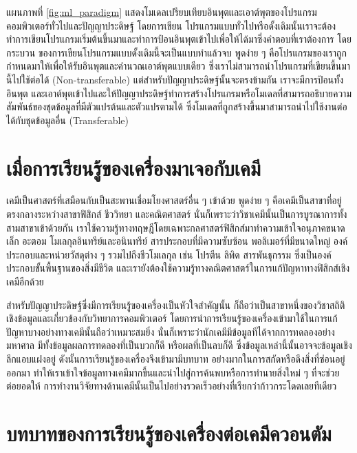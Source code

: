 แผนภาพที่ \ref{fig:ml_paradigm} แสดงโมเดลเปรียบเทียบอินพุตและเอาต์พุตของโปรแกรมคอมพิวเตอร์ทั่วไปและปัญญาประดิษฐ์ โดยการเขียน%
โปรแกรมแบบทั่วไปหรือดั้งเดิมนั้นเราจะต้องทำการเขียนโปรแกรมเริ่มต้นขึ้นมาและทำการป้อนอินพุตเข้าไปเพื่อให้ได้มาซึ่งคำตอบที่เราต้องการ โดยกระบวน%
ของการเขียนโปรแกรมแบบดั้งเดิมนี้จะเป็นแบบทำแล้วจบ พูดง่าย ๆ คือโปรแกรมของเราถูกกำหนดมาให้เพื่อให้รับอินพุตและคำนวณเอาต์พุตแบบเดียว
ซึ่งเราไม่สามารถนำโปรแกรมที่เขียนขึ้นมานี้ไปใช้ต่อได้ (Non-transferable) แต่สำหรับปัญญาประดิษฐ์นั้นจะตรงข้ามกัน เราจะมีการป้อนทั้งอินพุต%
และเอาต์พุตเข้าไปและให้ปัญญาประดิษฐ์ทำการสร้างโปรแกรมหรือโมเดลที่สามารถอธิบายความสัมพันธ์ของชุดข้อมูลที่มีตัวแปรต้นและตัวแปรตามได้ 
ซึ่งโมเดลที่ถูกสร้างขึ้นมาสามารถนำไปใช้งานต่อได้กับชุดข้อมูลอื่น (Transferable)

\section{เมื่อการเรียนรู้ของเครื่องมาเจอกับเคมี}

เคมีเป็นศาสตร์ที่เสมือนกับเป็นสะพานเชื่อมโยงศาสตร์อื่น ๆ เข้าด้วย พูดง่าย ๆ คือเคมีเป็นสาขาที่อยู่ตรงกลางระหว่างสาขาฟิสิกส์ ชีววิทยา และคณิตศาสตร์
นั่นก็เพราะว่าวิชาเคมีนั้นเป็นการบูรณาการทั้งสามสาขาเข้าด้วยกัน เราใช้ความรู้ทางทฤษฎีโดยเฉพาะกลศาสตร์ฟิสิกส์มาทำความเข้าใจอนุภาคขนาดเล็ก 
อะตอม โมเลกุลอินทรีย์และอนินทรีย์ สารประกอบที่มีความซับซ้อน พอลิเมอร์ที่มีขนาดใหญ่ องค์ประกอบและหน่วยวัสดุต่าง ๆ รวมไปถึงชีวโมเลกุล เช่น 
โปรตีน ลิพิด สารพันธุกรรม ซึ่งเป็นองค์ประกอบขั้นพื้นฐานของสิ่งมีชีวิต และเรายังต้องใช้ความรู้ทางคณิตศาสตร์ในการแก้ปัญหาทางฟิสิกส์เชิงเคมีอีกด้วย

สำหรับปัญญาประดิษฐ์ซึ่งมีการเรียนรู้ของเครื่องเป็นหัวใจสำคัญนั้น ก็ถือว่าเป็นสาขาหนึ่งของวิชาสถิติเชิงข้อมูลและเกี่ยวข้องกับวิทยาการคอมพิวเตอร์
โดยการนำการเรียนรู้ของเครื่องเข้ามาใช้ในการแก้ปัญหาบางอย่างทางเคมีนั้นถือว่าเหมาะสมยิ่ง นั่นก็เพราะว่านักเคมีมีข้อมูลทีได้จากการทดลองอย่างมหาศาล
มีทั้งข้อมูลผลการทดลองที่เป็นบวกก็ดี หรือผลที่เป็นลบก็ดี ซึ่งข้อมูลเหล่านี้นั้นอาจจะข้อมูลเชิงลึกแอบแฝงอยู่ ดังนั้นการเรียนรู้ของเครื่องจึงเข้ามามีบทบาท%
อย่างมากในการสกัดหรือดึงสิ่งที่ซ่อนอยู่ออกมา ทำให้เราเข้าใจข้อมูลทางเคมีมากขึ้นและนำไปสู่การค้นพบหรือการทำนายสิ่งใหม่ ๆ ที่จะช่วยต่อยอดให้%
การทำงานวิจัยทางด้านเคมีนั้นเป็นไปอย่างรวดเร็วอย่างที่เรียกว่าก้าวกระโดดเลยทีเดียว\autocite{cartwright2020,zotero-817}

\section{บทบาทของการเรียนรู้ของเครื่องต่อเคมีควอนตัม}

